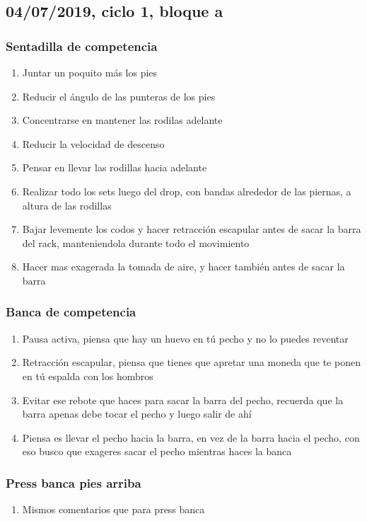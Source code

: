 \documentclass[11pt]{article}
\begin{document}
\subsection{04/07/2019, ciclo 1, bloque a}
\label{sec:org58799d5}
\subsubsection{Sentadilla de competencia}
\label{sec:orga97ccbe}
\begin{enumerate}
\item Juntar un poquito más los pies
\item Reducir el ángulo de las punteras de los pies
\item Concentrarse en mantener las rodilas adelante
\item Reducir la velocidad de descenso
\item Pensar en llevar las rodillas hacia adelante
\item Realizar todo los sets luego del drop, con bandas alrededor de las
piernas, a altura de las rodillas
\item Bajar levemente los codos y hacer retracción escapular antes de
sacar la barra del rack, manteniendola durante todo el movimiento
\item Hacer mas exagerada la tomada de aire, y hacer también antes de
sacar la barra
\end{enumerate}
\subsubsection{Banca de competencia}
\label{sec:orga097481}
\begin{enumerate}
\item Pausa activa, piensa que hay un huevo en tú pecho y no lo puedes
reventar
\item Retracción escapular, piensa que tienes que apretar una moneda que
te ponen en tú espalda con los hombros
\item Evitar ese rebote que haces para sacar la barra del pecho, recuerda
que la barra apenas debe tocar el pecho y luego salir de ahí
\item Piensa es llevar el pecho hacia la barra, en vez de la barra hacia
el pecho, con eso busco que exageres sacar el pecho mientras haces
la banca
\end{enumerate}
\subsubsection{Press banca pies arriba}
\label{sec:org6158497}
\begin{enumerate}
\item Mismos comentarios que para press banca
\end{enumerate}
\end{document}
